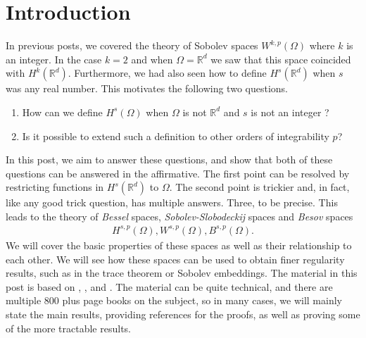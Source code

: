 \documentclass[
    a4paper,
    DIV=14,
    abstract=true,
    numbers=noenddot
]
{scrartcl}
\theoremstyle{definition}
\newcommand{\R}{\mathbb{R}}
\begin{document}
\section{Introduction}
In previous posts, we covered the theory of Sobolev spaces $W^{k,p}(\Omega )$ where $k$ is an integer. In the case $k=2$ and when $\Omega =\R^d$ we saw that this space coincided with $H^k(\R^d)$. Furthermore, we had also seen how to define $H^s(\R^d)$ when $s$ was any real number. This motivates the following two questions.
\begin{enumerate}
    \item How can we define $H^s(\Omega )$  when $\Omega $ is not $\R^d$ and $s$ is not an integer ?
    \item Is it possible to extend such a definition to other orders of integrability $p$?
\end{enumerate}
In this post, we aim to answer these questions, and show that both of these questions can be answered in the affirmative. The first point can be resolved by restricting functions in $H^s(\R^d)$ to $\Omega $. The second point is trickier and, in fact, like any good trick question, has multiple answers. Three, to be precise. This leads to the theory of \emph{Bessel} spaces, \emph{Sobolev-Slobodeckij} spaces and \emph{Besov} spaces
\begin{align*}
    H^{s,p}(\Omega ),W^{s,p}(\Omega ),B^{s,p}(\Omega ).
\end{align*}
We will cover the basic properties of these spaces as well as their relationship to each other. We will see how these spaces can be used to obtain finer regularity results, such as in the trace theorem or Sobolev embeddings. The material in this post is based on \cite{agranovich2015sobolev}, \cite{di2012hitchhiker's}, \cite{triebel1992theory} and \cite{stein1970singular}. The material can be quite technical, and there are multiple $800$ plus page books on the subject, so in many cases, we will mainly state the main results, providing references for the proofs, as well as proving some of the more tractable results.
\end{document}
